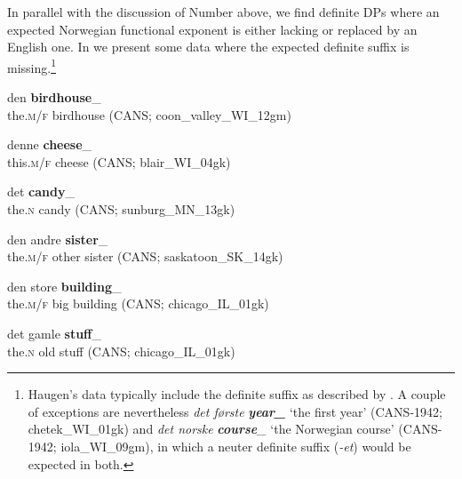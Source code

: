\documentclass[output=paper]{langscibook}
\begin{document}
In parallel with the discussion of Number above, we find definite DPs where an expected Norwegian functional exponent is either lacking or replaced by an English one. In  we present some data where the expected definite suffix is missing.\footnote{Haugen’s data typically include the definite suffix as described by \citet[451]{Haugen1953}. A couple of exceptions are nevertheless \textit{det første} \textrm{\textbf{\textit{year\_} }}\textrm{‘the first year’ (CANS-1942;} {\textrm{chetek\_WI\_01gk}}\textrm{) and} \textrm{\textit{det norske} }\textrm{\textbf{\textit{course}}}\textrm{\textit{\_} }\textrm{‘the Norwegian course’ (CANS-1942;} {\textrm{iola\_WI\_09gm}}\textrm{), in which a neuter definite suffix (}\textrm{\textit{{}-et}}) \textrm{would be expected in both.}}


\ea\label{ex:riksem:24}
\ea\label{ex:riksem:24a}
	 
	\gll den \textbf{birdhouse}\_\\
		 the.\textsc{m/f} birdhouse (CANS; %
         coon\_valley\_WI\_12gm)\\
\ex\label{ex:riksem:24b} 
	
	\gll denne \textbf{cheese}\_\\
		 this.\textsc{m/f} cheese (CANS; %
         blair\_WI\_04gk)\\
\ex\label{ex:riksem:24c} 
	
	\gll det \textbf{candy}\_\\
		 the.\textsc{n} candy (CANS; %
         sunburg\_MN\_13gk)\\
\ex\label{ex:riksem:24d} 
	
	\gll den andre \textbf{sister}\_\\
		 the.\textsc{m/f} other sister (CANS; %
         saskatoon\_SK\_14gk)\\
\ex\label{ex:riksem:24e} 
	
	\gll den store \textbf{building}\_\\
		 the.\textsc{m/f} big building (CANS; %
         chicago\_IL\_01gk)\\
\ex\label{ex:riksem:24f} 
	
	\gll det gamle \textbf{stuff}\_\\
		 the.\textsc{n} old stuff (CANS; %
         chicago\_IL\_01gk)\\
\z
\z
\end{document}
